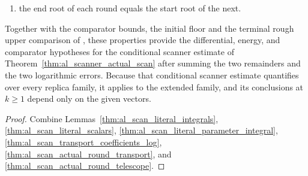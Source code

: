 \begin{lemma}
\begin{enumerate}
              $\langle v,\overline H_kv\rangle\le2\widetilde E_0
                  +Ca^2(\log n)^{C_l}\mathcal E(p)+\varepsilon_k$,
              where $\mathcal E$ is the energy sum of
              \cite[Proposition~7.4]{OpenAI2026AreaLaw};
        \item the end root of each round equals the start root of the next.
    \end{enumerate}
    Together with the comparator bounds, the initial floor and the terminal
    rough upper comparison of \cite[Proposition~8.1]{OpenAI2026AreaLaw},
    these properties provide the differential, energy, and comparator hypotheses for the
    conditional scanner estimate of
    Theorem~\ref{thm:al_scanner_actual_scan} after summing the two remainders and
    the two logarithmic errors. Because that conditional scanner estimate
    quantifies over every replica family, it applies to the extended family, and its
    conclusions at $k\ge1$ depend only on the given vectors.
\end{lemma}
\begin{proof}\leanok
    Combine Lemmas~\ref{thm:al_scan_literal_integrals},
    \ref{thm:al_scan_literal_scalars},
    \ref{thm:al_scan_literal_parameter_integral},
    \ref{thm:al_scan_transport_coefficients_log},
    \ref{thm:al_scan_actual_round_transport}, and
    \ref{thm:al_scan_actual_round_telescope}.
\end{proof}

